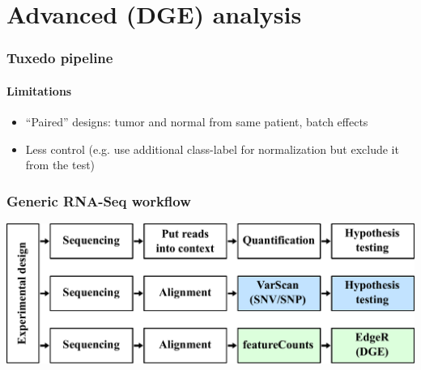 \documentclass{beamer}			  %
\begin{document}
\section{Advanced (DGE) analysis}

\begin{frame}
\frametitle{Tuxedo pipeline}
\framesubtitle{Limitations}
	\begin{itemize}
		\item ``Paired'' designs: tumor and normal from same patient, batch effects
		\item Less control (e.g. use additional class-label for normalization but exclude it from the test)
	\end{itemize}
\end{frame}

\begin{frame}
\frametitle{Generic RNA-Seq workflow}
	\begin{center}
		\includegraphics[width=\textwidth]{figures/dge_08p.pdf}
	\end{center}
\end{frame}

\end{document}
